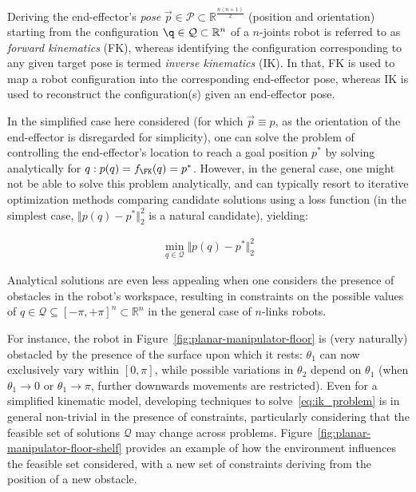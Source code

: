 Deriving the end-effector's \emph{pose} \( \vec{p} \in \mathcal{P} \subset \mathbb{R}^{\frac{n(n+1)}{2}} \) (position and orientation) starting from the configuration \( \q \in \mathcal Q \subset \mathbb R^n \) of a \( n \)-joints robot is referred to as \emph{forward kinematics} (FK), whereas identifying the configuration corresponding to any given target pose is termed \emph{inverse kinematics} (IK).
In that, FK is used to map a robot configuration into the corresponding end-effector pose, whereas IK is used to reconstruct the configuration(s) given an end-effector pose.

In the simplified case here considered (for which \( \vec{p} \equiv p \), as the orientation of the end-effector is disregarded for simplicity), one can solve the problem of controlling the end-effector's location to reach a goal position \( p^* \) by solving analytically for \( q: p(q) = f_{\FK}(q) = p^*\).
However, in the general case, one might not be able to solve this problem analytically, and can typically resort to iterative optimization methods comparing candidate solutions using a loss function (in the simplest case, \( \Vert p(q) - p^* \Vert_2^2 \) is a natural candidate), yielding:

\begin{align}
\min_{q \in \mathcal Q} \Vert p(q) - p^* \Vert_2^2
\label{eq:ik_problem}
\end{align}

Analytical solutions are even less appealing when one considers the presence of obstacles in the robot's workspace, resulting in constraints on the possible values of \( q \in \mathcal Q \subseteq [-\pi, +\pi]^n \subset \mathbb R^n \) in the general case of \(n\)-links robots.

For instance, the robot in Figure~\ref{fig:planar-manipulator-floor} is (very naturally) obstacled by the presence of the surface upon which it rests: \( \theta_1 \) can now exclusively vary within \([0,  \pi] \), while possible variations in \( \theta_2 \) depend on \( \theta_1 \) (when \( \theta_1 \to 0 \) or \( \theta_1 \to \pi \), further downwards movements are restricted).
Even for a simplified kinematic model, developing techniques to solve~\ref{eq:ik_problem} is in general non-trivial in the presence of constraints, particularly considering that the feasible set of solutions \( \mathcal Q \) may change across problems.
Figure~\ref{fig:planar-manipulator-floor-shelf} provides an example of how the environment influences the feasible set considered, with a new set of constraints deriving from the position of a new obstacle.

